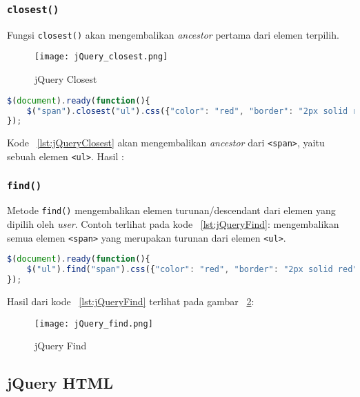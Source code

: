 \subsubsection{\texttt{closest()}}
Fungsi \texttt{closest()} akan mengembalikan \textit{ancestor} pertama dari elemen terpilih.
\begin{figure} [H]
	\centering  
	\texttt{[image: jQuery\_closest.png]}  
	\caption{jQuery Closest} 
	\label{fig:jQueryClosest}
\end{figure}

\begin{lstlisting}[style=JavaScript, language=JavaScript,  basicstyle=\ttfamily, frame=single, columns=fullflexible, keepspaces=true, breaklines=true, showstringspaces=false, label={lst:jQueryClosest}, caption=jQuery Closest.]
$(document).ready(function(){
	$("span").closest("ul").css({"color": "red", "border": "2px solid red"});
});
\end{lstlisting}

Kode ~\ref{lst:jQueryClosest} akan mengembalikan \textit{ancestor} dari \texttt{<span>}, yaitu sebuah elemen \texttt{<ul>}.
Hasil :

\subsubsection{\texttt{find()}}
Metode \texttt{find()} mengembalikan elemen turunan/descendant dari elemen yang dipilih oleh \textit{user}.
Contoh terlihat pada kode ~\ref{lst:jQueryFind}: mengembalikan semua elemen \texttt{<span>} yang merupakan turunan dari elemen \texttt{<ul>}.

\begin{lstlisting}[style=JavaScript, language=JavaScript,  basicstyle=\ttfamily, frame=single, columns=fullflexible, keepspaces=true, breaklines=true, showstringspaces=false, breaklines=true, label={lst:jQueryFind}, caption=jQuery find().]
$(document).ready(function(){
	$("ul").find("span").css({"color": "red", "border": "2px solid red"});
});
\end{lstlisting}

\noindent Hasil dari kode  ~\ref{lst:jQueryFind} terlihat pada gambar ~\ref{fig:jQueryfind}: 
\begin{figure} [H]
	\centering  
	\texttt{[image: jQuery\_find.png]}  
	\caption{jQuery Find} 
	\label{fig:jQueryfind}
\end{figure}


\subsection{jQuery HTML}
